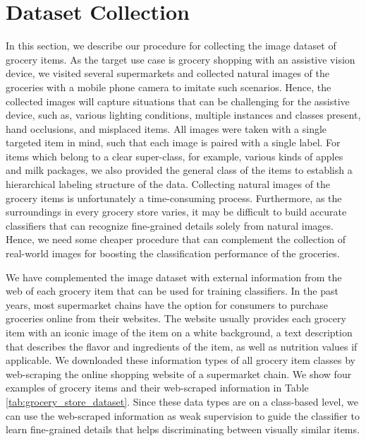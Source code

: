 

\section{Dataset Collection}
In this section, we describe our procedure for collecting the image dataset of grocery items. As the target use case is grocery shopping with an assistive vision device, we visited several supermarkets and collected natural images of the groceries with a mobile phone camera to imitate such scenarios. Hence, the collected images will capture situations that can be challenging for the assistive device, such as, various lighting conditions, multiple instances and classes present, hand occlusions, and misplaced items. All images were taken with a single targeted item in mind, such that each image is paired with a single label. For items which belong to a clear super-class, for example, various kinds of apples and milk packages, we also provided the general class of the items to establish a hierarchical labeling structure of the data. Collecting natural images of the grocery items is unfortunately a time-consuming process. Furthermore, as the surroundings in every grocery store varies, it may be difficult to build accurate classifiers that can recognize fine-grained details solely from natural images. Hence, we need some cheaper procedure that can complement the collection of real-world images for boosting the classification performance of the groceries. 

We have complemented the image dataset with external information from the web of each grocery item that can be used for training classifiers. In the past years, most supermarket chains have the option for consumers to purchase groceries online from their websites. The website usually provides each grocery item with an iconic image of the item on a white background, a text description that describes the flavor and ingredients of the item, as well as nutrition values if applicable. We downloaded these information types of all grocery item classes by web-scraping the online shopping website of a supermarket chain. We show four examples of grocery items and their web-scraped information in Table \ref{tab:grocery_store_dataset}. Since these data types are on a class-based level, we can use the web-scraped information as weak supervision to guide the classifier to learn fine-grained details that helps discriminating between visually similar items.   


